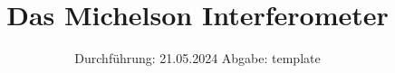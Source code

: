 

\subject{v401}
\title{Das Michelson Interferometer}
\date{%
  Durchführung: 21.05.2024
  \hspace{3em}
  Abgabe: template
}



\maketitle
\thispagestyle{empty}
\tableofcontents
\newpage






\printbibliography{}

